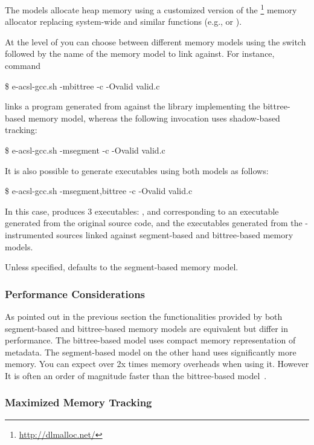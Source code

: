 The \eacsl models allocate heap memory using a customized version of the
\dlmalloc\footnote{\url{http://dlmalloc.net/}} memory allocator replacing
system-wide  and similar functions (e.g.,  or ).

At the level of \eacslgcc you can choose between different memory models using
the  switch followed by the name of the memory model to link
against.  For instance, command
\begin{shell}
\$ e-acsl-gcc.sh -mbittree -c -Ovalid valid.c
\end{shell}
links a program generated from  against the library implementing the
bittree-based memory model, whereas the following invocation uses shadow-based
tracking:
\begin{shell}
\$ e-acsl-gcc.sh -msegment -c -Ovalid valid.c
\end{shell}
It is also possible to generate executables using both models as follows:
\begin{shell}
\$ e-acsl-gcc.sh -msegment,bittree -c -Ovalid valid.c
\end{shell}
In this case, \eacslgcc produces 3 executables: ,
 and  corresponding to an
executable generated from the original source code, and the executables
generated from the \eacsl-instrumented sources linked against
segment-based and bittree-based memory models.

Unless specified, \eacsl defaults to the segment-based memory model.

\subsubsection{Performance Considerations}
\label{sec:perf}

As pointed out in the previous section the functionalities provided by both
segment-based and bittree-based memory models are equivalent but differ in
performance. The bittree-based model uses compact memory representation of
metadata. The segment-based model on the other hand uses significantly more
memory. You can expect over 2x times memory overheads when using it. However It
is often an order of magnitude faster than the bittree-based
model~\cite{vorobyov17ismm}.


\subsubsection{Maximized Memory Tracking}

